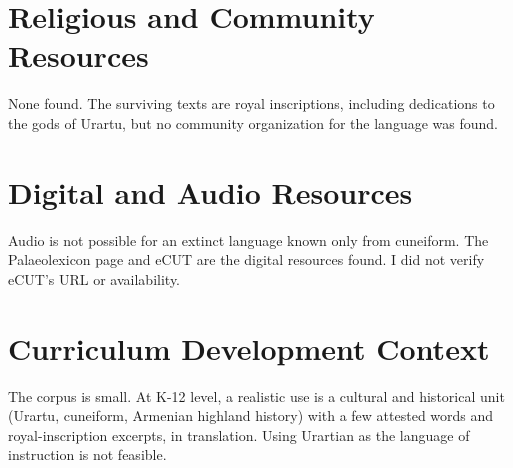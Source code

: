 \documentclass[12pt]{article}
\begin{document}
\section{Religious and Community Resources}
None found. The surviving texts are royal inscriptions, including dedications to the gods of Urartu, but no community organization for the language was found.

\section{Digital and Audio Resources}
Audio is not possible for an extinct language known only from cuneiform. The Palaeolexicon page and eCUT are the digital resources found. I did not verify eCUT's URL or availability.

\section{Curriculum Development Context}
The corpus is small. At K-12 level, a realistic use is a cultural and historical unit (Urartu, cuneiform, Armenian highland history) with a few attested words and royal-inscription excerpts, in translation. Using Urartian as the language of instruction is not feasible.
\end{document}
